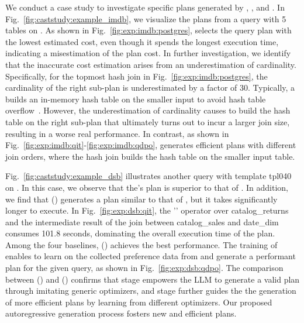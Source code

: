 We conduct a case study to investigate specific plans generated by \Postgres, \Oracle, and \LLMQO.
In Fig.~\ref{fig:caststudy:example_imdb}, we visualize the plans from a query with 5 tables on \imdb. 
As shown in Fig.~\ref{fig:exp:imdb:postgres}, \Postgres selects the query plan with the lowest estimated cost, even though it spends the longest execution time, indicating a misestimation of the plan cost. In further investigation, we identify that the inaccurate cost estimation arises from an underestimation of cardinality. Specifically, for the topmost hash join in Fig.~\ref{fig:exp:imdb:postgres}, the cardinality of the right sub-plan is underestimated by a factor of 30. Typically, a \HashJoin  builds an in-memory hash table on the smaller input to avoid hash table overflow~\cite{graefe1994sort}. However, the underestimation of cardinality causes \Postgres to build the hash table on the right sub-plan that ultimately turns out to incur a larger join size, resulting in a worse real performance. 
In contrast, as shown in Fig.~\ref{fig:exp:imdb:qit}-\ref{fig:exp:imdb:qdpo}, 
\LLMQO generates efficient plans with different join orders, where the hash join builds the hash table on the smaller input table. 

Fig.~\ref{fig:caststudy:example_dsb} illustrates another query with template tpl040 on \dsb. 
In this case, we observe that the\Oracle's plan is superior to that of \Postgres. 
In addition, we find that \LLMQO(\QIT) generates a plan similar to that of \Postgres, but it takes significantly longer to execute. 
In Fig.~\ref{fig:exp:dsb:qit}, the '\NestLoop' operator over catalog\_returns and the intermediate result of the join between catalog\_sales and date\_dim consumes 101.8 seconds, dominating the overall execution time of the plan.
Among the four baselines, \LLMQO (\QDPO) achieves the best performance.
The training of \QDPO enables \LLMQO to learn on the collected preference data from \Oracle and generate a performant plan for the given query, as shown in Fig.~\ref{fig:exp:dsb:qdpo}.
The comparison between \LLMQO (\QIT) and \LLMQO (\QDPO) confirms that \QIT stage empowers the LLM to generate a valid plan through imitating generic optimizers, and \QDPO stage further guides the the generation of more efficient plans by learning from different optimizers. Our proposed autoregressive generation process fosters new and efficient plans.

